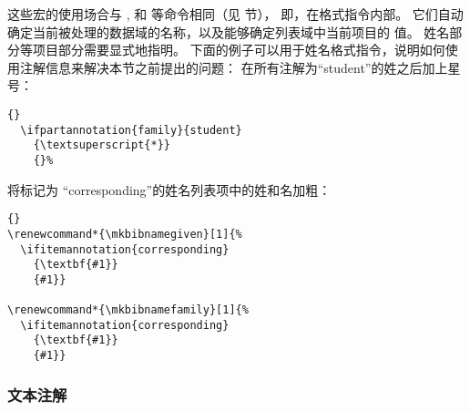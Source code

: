 %
这些宏的使用场合与 ,  和  等命令相同（见  节），
即，在格式指令内部。
它们自动确定当前被处理的数据域的名称，以及能够确定列表域中当前项目的  值。
姓名部分等项目部分需要显式地指明。
下面的例子可以用于姓名格式指令，说明如何使用注解信息来解决本节之前提出的问题：
在所有注解为“student”的姓之后加上星号：

\begin{lstlisting}[style=latex]{}
  \ifpartannotation{family}{student}
    {\textsuperscript{*}}
    {}%
\end{lstlisting}
%
将标记为 “corresponding”的姓名列表项中的姓和名加粗：

\begin{lstlisting}[style=latex]{}
\renewcommand*{\mkbibnamegiven}[1]{%
  \ifitemannotation{corresponding}
    {\textbf{#1}}
    {#1}}

\renewcommand*{\mkbibnamefamily}[1]{%
  \ifitemannotation{corresponding}
    {\textbf{#1}}
    {#1}}
\end{lstlisting}


\subsubsection{文本注解}


